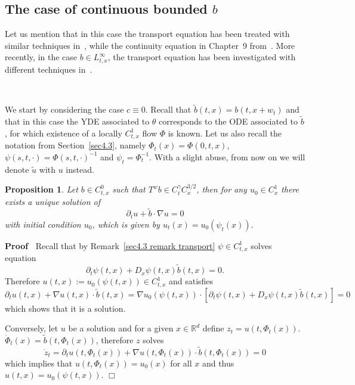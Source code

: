 \documentclass[10pt]{article}
\newcommand{\assign}{:=}
\newenvironment{proof}{\noindent\textbf{Proof\ }}{\hspace*{\fill}$\Box$\medskip}
\newtheorem{proposition}{Proposition}
{\theorembodyfont{\rmfamily}\newtheorem{remark}{Remark}}
\begin{document}
\subsection{The case of continuous bounded $b$}\label{sec5.1}

Let us mention that in this case the transport equation has been treated with
similar techniques in~{\cite{catellier}}, while the continuity equation in
Chapter~9 from~{\cite{maurelli}}. More recently, in the case $b \in
L^{\infty}_{t, x}$, the transport equation has been investigated with
different techniques in~{\cite{amine2020}}.

\

We start by considering the case $c \equiv 0$. Recall that $\tilde{b} (t, x)
= b (t, x + w_t)$ and that in this case the YDE associated to $\theta$
corresponds to the ODE associated to $\tilde{b}$, for which existence of a
locally $C^1_{t, x}$ flow $\Phi$ is known. Let us also recall the notation
from Section~\ref{sec4.3}, namely $\Phi_t (x) = \Phi (0, t, x)$, $\psi (s, t,
\cdot) = \Phi (s, t, \cdot)^{- 1}$ and $\psi_t = \Phi_t^{- 1}$. With a slight
abuse, from now on we will denote $\tilde{u}$ with $u$ instead.

\begin{proposition}
  \label{sec5.1 thm transport}Let $b \in C^0_{t, x}$ such that $T^w b \in
  C^{\gamma}_t C^{3 / 2}_x$, then for any $u_0 \in C^1_x$ there exists a
  unique solution of
  \begin{equation}
    \partial_t u + \tilde{b} \cdot \nabla u = 0 \label{sec5.1 transport eq}
  \end{equation}
  with initial condition $u_0$, which is given by $u_t (x) = u_0 (\psi_t
  (x))$.
\end{proposition}

\begin{proof}
  Recall that by Remark~\ref{sec4.3 remark transport} $\psi \in C^1_{t, x}$
  solves equation
  \[ \partial_t \psi (t, x) + D_x \psi (t, x)  \tilde{b} (t, x) = 0. \]
  Therefore $u (t, x) \assign u_0 (\psi (t, x)) \in C^1_{t, x}$ and satisfies
  \[ \partial_t u (t, x) + \nabla u (t, x) \cdot \tilde{b} (t, x) = \nabla u_0
     (\psi (t, x)) \cdot [\partial_t \psi (t, x) + D_x \psi (t, x) \tilde{b}
     (t, x)] = 0 \]
  which shows that it is a solution.
  
  Conversely, let $u$ be a solution and for a given $x \in \mathbb{R}^d$
  define $z_t = u (t, \Phi_t (x))$. $\dot{\Phi}_t (x) = \tilde{b} (t, \Phi_t
  (x))$, therefore $z$ solves
  \[ \dot{z}_t = \partial_t u (t, \Phi_t (x)) + \nabla u (t, \Phi_t (x)) \cdot
     \tilde{b} (t, \Phi_t (x)) = 0 \]
  which implies that $u (t, \Phi_t (x)) = u_0 (x)$ for all $x$ and thus $u (t,
  x) = u_0 (\psi (t, x))$.
\end{proof}
\end{document}
